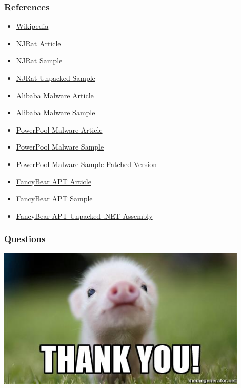\documentclass[aspectratio=169]{beamer}
\begin{document}
\begin{frame}
  \frametitle{References}
  \begin{center}
    \begin{itemize}
    \item{\href{https://en.wikipedia.org/wiki/Main_Page}{Wikipedia}}
    \item{\href{https://ti.360.net/blog/articles/analysis-of-apt-c-27/}{NJRat Article}}
    \item{\href{https://www.virustotal.com/\#/file/0a9c88d03260b92608c9c079a1b449cf46e5cd764f12f2ec852038dd6bd0fa97/detection}{NJRat Sample}}
    \item{\href{https://www.virustotal.com/\#/file/4e51a6779a7776055ebdeffe28d00e8866b2e722e3ccb6cba868cf8cdc86b1a3/detection}{NJRat Unpacked Sample}}
    \item{\href{http://sfkino.tistory.com/70}{Alibaba Malware Article}}
    \item{\href{https://www.virustotal.com/\#/file/d057088d0de3d920ea0939217c756274018b6e89cbfc74f66f50a9d27a384b09/detection}{Alibaba Malware Sample}}
    \item{\href{https://www.welivesecurity.com/2018/09/05/powerpool-malware-exploits-zero-day-vulnerability/}{PowerPool Malware Article}}
    \item{\href{https://www.virustotal.com/\#/file/58a50840c04cd15f439f1cc1b684e9f9fa22c0d64f44a391d9e2b1222e5cd6bd/details}{PowerPool Malware Sample}}
    \item{\href{https://www.virustotal.com/\#/file/9c08136b26ee5234c61a5d9e5a17afb15da35efc66514d2df5b53178693644c5/detection}{PowerPool Malware Sample Patched Version}}
    \item{\href{https://www.symantec.com/security-center/writeup/2018-092116-1134-99?om_rssid=sr-latestthreats30days\#technicaldescription}{FancyBear APT Article}}
    \item{\href{https://www.virustotal.com/\#/file/a37eda810ca92486bfb0e1f1b27adb7c9df57aafab686c000ae1d6ec5d6f6180/detection}{FancyBear APT Sample}}
    \item{\href{https://www.virustotal.com/\#/file/90e7c99effc7e4360c45a2af7ca9cc23313902a40c30d48cac8db048e9e4c0f6/detection}{FancyBear APT Unpacked .NET Assembly}}
    \end{itemize}
  \end{center}
\end{frame}

\begin{frame}
  \frametitle{Questions}
  \begin{center}
    \includegraphics[width=12cm,keepaspectratio]{thank_you}
  \end{center}
\end{frame}
\end{document}
